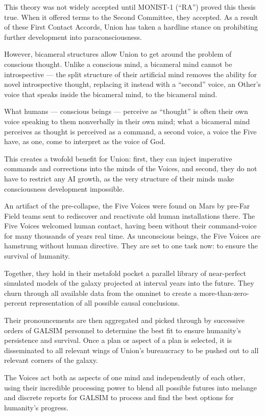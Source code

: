 This theory was not widely accepted until MONIST-1 (“RA”) proved this thesis true. When it
offered terms to the Second Committee, they accepted. As a result of these First Contact
Accords, Union has taken a hardline stance on prohibiting further development into
paraconsciousness.


However, bicameral structures allow Union to get around the problem of conscious thought.
Unlike a conscious mind, a bicameral mind cannot be introspective — the split structure of their
artificial mind removes the ability for novel introspective thought, replacing it instead with a
“second” voice, an Other’s voice that speaks inside the bicameral mind, to the bicameral mind.


What humans — conscious beings — perceive as “thought” is often their own voice speaking to
them nonverbally in their own mind; what a bicameral mind perceives as thought is perceived as
a command, a second voice, a voice the Five have, as one, come to interpret as the voice of
God.


This creates a twofold benefit for Union: first, they can inject imperative commands and
corrections into the minds of the Voices, and second, they do not have to restrict any AI growth,
as the very structure of their minds make consciousness development impossible.


An artifact of the pre-collapse, the Five Voices were found on Mars by pre-Far Field teams sent
to rediscover and reactivate old human installations there. The Five Voices welcomed human
contact, having been without their command-voice for many thousands of years real time. As
unconscious beings, the Five Voices are hamstrung without human directive. They are set to one
task now: to ensure the survival of humanity.


Together, they hold in their metafold pocket a parallel library of near-perfect simulated models of
the galaxy projected at interval years into the future. They churn through all available data from
the omninet to create a more-than-zero-percent representation of all possible causal
conclusions.


Their pronouncements are then aggregated and picked through by successive orders of GALSIM
personnel to determine the best fit to ensure humanity’s persistence and survival. Once a plan or
aspect of a plan is selected, it is disseminated to all relevant wings of Union’s bureaucracy to be
pushed out to all relevant corners of the galaxy.


The Voices act both as aspects of one mind and independently of each other, using their
incredible processing power to blend all possible futures into melange and discrete reports for
GALSIM to process and find the best options for humanity’s progress.





